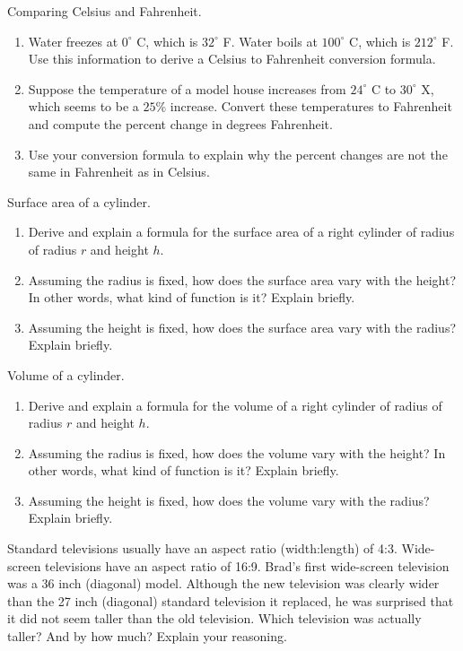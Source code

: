 \begin{prob}
Comparing Celsius and Fahrenheit.  
\begin{enumerate}
\item Water freezes at $0^\circ$ C, which is $32^\circ$ F.  Water boils at $100^\circ$ C, which is $212^\circ$ F.  Use this information to derive a Celsius to Fahrenheit conversion formula.  
\item Suppose the temperature of a model house increases from $24^\circ$ C to $30^\circ$ X, which seems to be a $25\%$ increase.  Convert these temperatures to Fahrenheit and compute the percent change in degrees Fahrenheit. 
\item Use your conversion formula to explain why the percent changes are not the same in Fahrenheit as in Celsius.  
\end{enumerate}
\end{prob}


\begin{prob}
Surface area of a cylinder.
\begin{enumerate}
\item Derive and explain a formula for the surface area of a right cylinder of radius of radius $r$ and height $h$.  
\item Assuming the radius is fixed, how does the surface area vary with the height?  In other words, what kind of function is it?  Explain briefly.  
\item Assuming the height is fixed, how does the surface area vary with the radius?  Explain briefly. 
\end{enumerate}
\end{prob}

\begin{prob}
Volume of a cylinder.
\begin{enumerate}
\item Derive and explain a formula for the volume of a right cylinder of radius of radius $r$ and height $h$.  
\item Assuming the radius is fixed, how does the volume vary with the height?  In other words, what kind of function is it?  Explain briefly.  
\item Assuming the height is fixed, how does the volume vary with the radius?  Explain briefly. 
\end{enumerate}
\end{prob}


\begin{prob}
Standard televisions usually have an aspect ratio (width:length) of 4:3.  Wide-screen televisions have an aspect ratio of 16:9.  Brad's first wide-screen television was a 36 inch (diagonal) model.  Although the new television was clearly wider than the 27 inch (diagonal) standard television it replaced, he was surprised that it did not seem taller than the old television.  Which television was actually taller?  And by how much?  Explain your reasoning.   
\end{prob}

